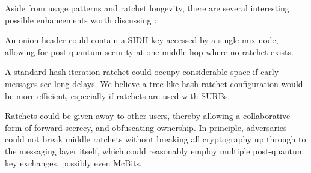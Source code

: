 \documentclass[twoside,letterpaper]{sig-alternate}
\begin{document}
Aside from usage patterns and ratchet longevity,
there are several interesting possible enhancements worth discussing : 

An onion header could contain a SIDH key accessed by a single mix node,
allowing for post-quantum security at one middle hop
 where no ratchet exists.

A standard hash iteration ratchet could occupy considerable space
 if early messages see long delays. 
We believe a tree-like hash ratchet configuration would be more efficient,
 especially if ratchets are used with SURBs.

Ratchets could be given away to other users, thereby allowing a
collaborative form of forward secrecy, and obfuscating ownership. 
In principle, adversaries could not break middle ratchets without
breaking all cryptography up through to the messaging layer itself,
which could reasonably employ multiple post-quantum key exchanges,
 possibly even McBits.







\end{document}
